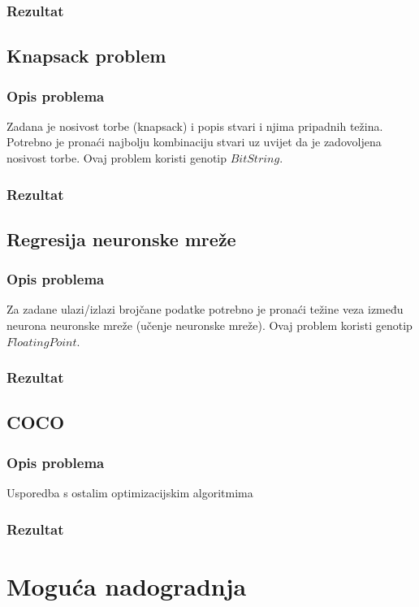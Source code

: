 \documentclass[times, utf8, zavrsni]{fer}
\begin{document}
\subsection{Rezultat}

\section{Knapsack problem}
\subsection{Opis problema}
Zadana je nosivost torbe (knapsack) i popis stvari i njima pripadnih težina.
Potrebno je pronaći najbolju kombinaciju stvari uz uvijet da je zadovoljena nosivost torbe.
Ovaj problem koristi genotip $BitString$.

\subsection{Rezultat}

\section{Regresija neuronske mreže}
\subsection{Opis problema}
Za zadane ulazi/izlazi brojčane podatke potrebno je pronaći težine veza između neurona neuronske mreže (učenje neuronske mreže). Ovaj problem koristi genotip $FloatingPoint$.

\subsection{Rezultat}

\section{COCO}
\subsection{Opis problema}
Usporedba s ostalim optimizacijskim algoritmima

\subsection{Rezultat}


\chapter{Moguća nadogradnja}
\end{document}
